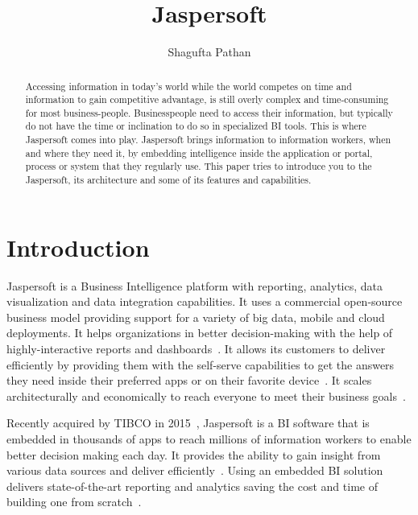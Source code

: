 
\title{Jaspersoft}


\author{Shagufta Pathan}

\renewcommand{\shortauthors}{G. v. Laszewski}


\begin{abstract}
Accessing information in today's world while the world competes on time and
information to gain competitive advantage, is still overly complex and
time-consuming for most business-people. Businesspeople need to access their
information, but typically do not have the time or inclination to do so in
specialized BI tools. This is where Jaspersoft comes into play. Jaspersoft
brings information to information workers, when and where they need it, by
embedding intelligence inside the application or portal, process or system that
they regularly use. This paper tries to introduce you to the Jaspersoft, its
architecture and some of its features and capabilities. 
\end{abstract}


\maketitle

\section{Introduction}
Jaspersoft is a Business Intelligence platform with reporting, analytics, data
visualization and data integration capabilities. It uses a commercial
open-source business model providing support for a variety of big data, mobile
and cloud deployments. It helps organizations in better decision-making with the
help of highly-interactive reports and
dashboards~\cite{hid-sp18-516-www-finances-online}. It allows its customers to
deliver efficiently by providing them with the self-serve capabilities to get
the answers they need inside their preferred apps or on their favorite
device~\cite{hid-sp18-516-www-jaspersoft-overview}. It scales architecturally
and economically to reach everyone to meet their business
goals~\cite{hid-sp18-516-www-finances-online}. 

Recently acquired by TIBCO in 2015~\cite{hid-sp18-516-www-wiki-jasperreports},
Jaspersoft is a BI software that is embedded in thousands of apps to reach
millions of information workers to enable better decision making each day. It
provides the ability to gain insight from various data sources and deliver
efficiently~\cite{hid-sp18-516-www-jaspersoft-overview}. Using an embedded BI
solution delivers state-of-the-art reporting and analytics saving the cost and
time of building one from scratch~\cite{hid-sp18-516-www-embedded-bi}. 



